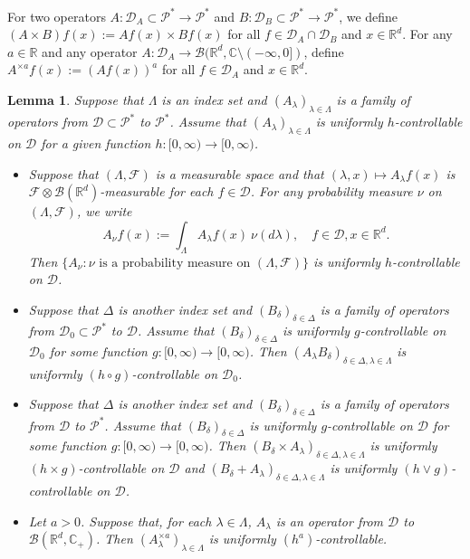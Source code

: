 \documentclass[12pt,a4paper]{amsart}
\theoremstyle{plain}
\newtheorem{lem}[thm]{Lemma}
\theoremstyle{definition}
\numberwithin{equation}{section}
\begin{document}
    For two operators $A: \mathcal D_A \subset \mathcal P^*\to \mathcal P^*$ and $B: \mathcal D_B \subset \mathcal P^*\to \mathcal P^*$, we define $(A \times B)f (x):= Af(x) \times Bf(x)$ for all $f\in \mathcal D_A \cap \mathcal D_B$ and $x\in \mathbb{R}^d$.
    For any $a \in \mathbb R$ and any operator $A :\mathcal D_A \to \mathcal B(\mathbb R^d, \mathbb C\setminus (-\infty, 0])$, define $A^{\times a}f(x):= (Af(x))^a$ for all $f\in \mathcal D_A$ and $x\in \mathbb R^d$.
\begin{lem}\label{lem: property of controllable operators}
Suppose that $\Lambda$ is an index set and $(A_\lambda)_{\lambda\in \Lambda}$ is a
family of operators from $\mathcal D\subset \mathcal P^*$ to $ \mathcal P^*$.
    Assume that $(A_\lambda)_{\lambda\in \Lambda}$ is uniformly $h$-controllable on $\mathcal D$ for a given function $h:[0,\infty) \to [0, \infty)$.
\begin{itemize}
\item[(1)]
    Suppose that $(\Lambda, \mathscr F)$ is a measurable space and that $(\lambda,x)\mapsto A_\lambda f(x)$ is $\mathscr F \otimes \mathscr B(\mathbb R^d)$-measurable for each $f\in \mathcal D$.
    For any probability measure $\nu$ on $(\Lambda, \mathscr F)$,  we write
\[
    A_\nu f(x)
    := \int_{\Lambda} A_\lambda f (x)~\nu(d\lambda),
    \quad f\in \mathcal D, x\in \mathbb R^d.
\]
    Then  $\{A_\nu: \nu \text{ is  a probability measure on } (\Lambda, \mathscr F)\}$ is uniformly $h$-controllable on $\mathcal D$.
\item[(2)]
    Suppose that $\Delta$ is another index set and $(B_\delta)_{\delta\in \Delta}$ is a family of operators from $\mathcal D_0\subset \mathcal P^*$ to $ \mathcal D$.
    Assume that $(B_\delta)_{\delta\in \Delta}$ is uniformly $g$-controllable on $\mathcal D_0$ for some function $g: [0,\infty) \to [0,\infty)$.
    Then $(A_\lambda B_\delta)_{\delta\in \Delta, \lambda \in \Lambda}$ is uniformly $(h \circ g)$-controllable on $\mathcal D_0$.
\item[(3)]
    Suppose that $\Delta$ is another index set and $(B_\delta)_{\delta\in \Delta}$ is a family of operators from $\mathcal D$ to $ \mathcal P^*$.
    Assume that $(B_\delta)_{\delta\in \Delta}$ is uniformly $g$-controllable on $\mathcal D$ for some function $g: [0,\infty) \to [0,\infty)$.
    Then  $(B_\delta\times A_\lambda)_{\delta \in \Delta, \lambda \in \Lambda}$ is uniformly $(h\times g)$-controllable on $\mathcal D$ and $(B_\delta + A_\lambda)_{\delta \in \Delta, \lambda \in \Lambda}$ is uniformly $(h\vee g)$-controllable on $\mathcal D$.
\item[(4)]
    Let $a>0$.
    Suppose that, for each $\lambda \in \Lambda$, $A_\lambda$ is an operator from $\mathcal D$ to $\mathcal B(\mathbb R^d, \mathbb C_+)$.
    Then $(A^{\times a}_\lambda)_{\lambda \in \Lambda}$ is uniformly $(h^a)$-controllable.
\end{itemize}
\end{lem}
\end{document}
